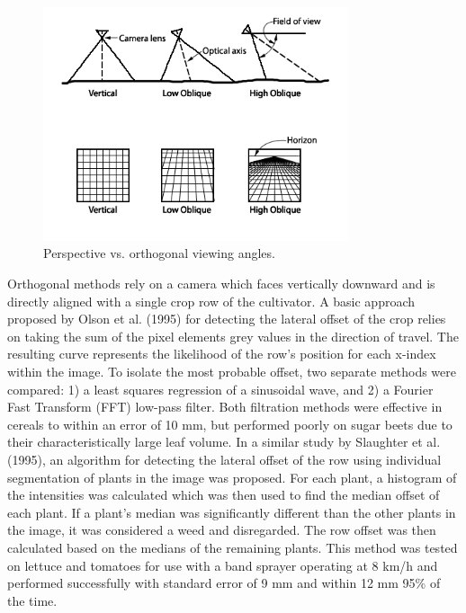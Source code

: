 \documentclass[authoryear]{elsarticle}
\begin{document}
\begin{figure}
  \centering
  \includegraphics[width=0.8\textwidth,natwidth=610,natheight=642]{oblique_projection.jpg}
  \caption{Perspective vs. orthogonal viewing angles.}
  \label{fig:projection}
\end{figure}

Orthogonal methods rely on a camera which faces vertically downward
and is directly aligned with a single crop row of the cultivator. A
basic approach proposed by Olson et al. (1995) for detecting the
lateral offset of the crop relies on taking the sum of the pixel
elements grey values in the direction of travel. The resulting curve
represents the likelihood of the row’s position for each x-index
within the image. To isolate the most probable offset, two separate
methods were compared: 1) a least squares regression of a sinusoidal
wave, and 2) a Fourier Fast Transform (FFT) low-pass filter. Both
filtration methods were effective in cereals to within an error of 10
mm, but performed poorly on sugar beets due to their
characteristically large leaf volume. In a similar study by Slaughter
et al. (1995), an algorithm for detecting the lateral offset of the
row using individual segmentation of plants in the image was
proposed. For each plant, a histogram of the intensities was
calculated which was then used to find the median offset of each
plant. If a plant’s median was significantly different than the other
plants in the image, it was considered a weed and disregarded. The row
offset was then calculated based on the medians of the remaining
plants. This method was tested on lettuce and tomatoes for use with a
band sprayer operating at 8 km/h and performed successfully with
standard error of 9 mm and within 12 mm 95\% of the time.
\end{document}
